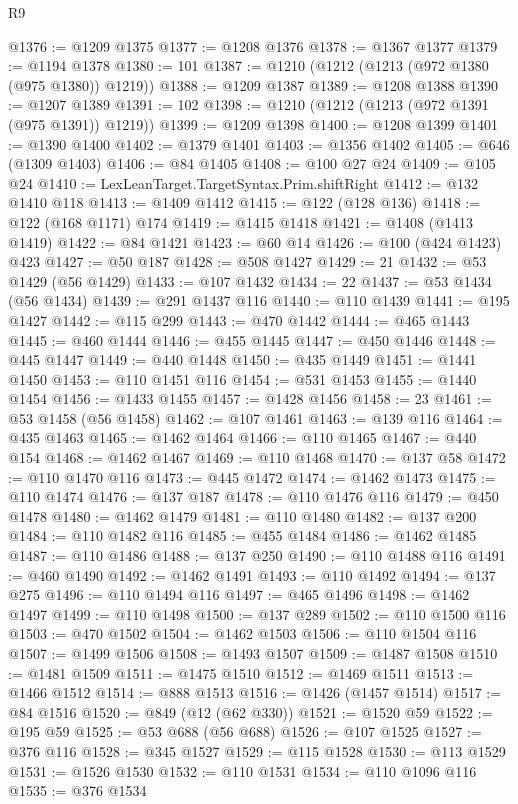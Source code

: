 \begin{lexlean}{R9}
\begin{coremodule}
@1376 := @1209 @1375
@1377 := @1208 @1376
@1378 := @1367 @1377
@1379 := @1194 @1378
@1380 := 101
@1387 := @1210 (@1212 (@1213 (@972 @1380 (@975 @1380)) @1219))
@1388 := @1209 @1387
@1389 := @1208 @1388
@1390 := @1207 @1389
@1391 := 102
@1398 := @1210 (@1212 (@1213 (@972 @1391 (@975 @1391)) @1219))
@1399 := @1209 @1398
@1400 := @1208 @1399
@1401 := @1390 @1400
@1402 := @1379 @1401
@1403 := @1356 @1402
@1405 := @646 (@1309 @1403)
@1406 := @84 @1405
@1408 := @100 @27 @24
@1409 := @105 @24
@1410 := LexLeanTarget.TargetSyntax.Prim.shiftRight
@1412 := @132 @1410 @118
@1413 := @1409 @1412
@1415 := @122 (@128 @136)
@1418 := @122 (@168 @1171) @174
@1419 := @1415 @1418
@1421 := @1408 (@1413 @1419)
@1422 := @84 @1421
@1423 := @60 @14
@1426 := @100 (@424 @1423) @423
@1427 := @50 @187
@1428 := @508 @1427
@1429 := 21
@1432 := @53 @1429 (@56 @1429)
@1433 := @107 @1432
@1434 := 22
@1437 := @53 @1434 (@56 @1434)
@1439 := @291 @1437 @116
@1440 := @110 @1439
@1441 := @195 @1427
@1442 := @115 @299
@1443 := @470 @1442
@1444 := @465 @1443
@1445 := @460 @1444
@1446 := @455 @1445
@1447 := @450 @1446
@1448 := @445 @1447
@1449 := @440 @1448
@1450 := @435 @1449
@1451 := @1441 @1450
@1453 := @110 @1451 @116
@1454 := @531 @1453
@1455 := @1440 @1454
@1456 := @1433 @1455
@1457 := @1428 @1456
@1458 := 23
@1461 := @53 @1458 (@56 @1458)
@1462 := @107 @1461
@1463 := @139 @116
@1464 := @435 @1463
@1465 := @1462 @1464
@1466 := @110 @1465
@1467 := @440 @154
@1468 := @1462 @1467
@1469 := @110 @1468
@1470 := @137 @58
@1472 := @110 @1470 @116
@1473 := @445 @1472
@1474 := @1462 @1473
@1475 := @110 @1474
@1476 := @137 @187
@1478 := @110 @1476 @116
@1479 := @450 @1478
@1480 := @1462 @1479
@1481 := @110 @1480
@1482 := @137 @200
@1484 := @110 @1482 @116
@1485 := @455 @1484
@1486 := @1462 @1485
@1487 := @110 @1486
@1488 := @137 @250
@1490 := @110 @1488 @116
@1491 := @460 @1490
@1492 := @1462 @1491
@1493 := @110 @1492
@1494 := @137 @275
@1496 := @110 @1494 @116
@1497 := @465 @1496
@1498 := @1462 @1497
@1499 := @110 @1498
@1500 := @137 @289
@1502 := @110 @1500 @116
@1503 := @470 @1502
@1504 := @1462 @1503
@1506 := @110 @1504 @116
@1507 := @1499 @1506
@1508 := @1493 @1507
@1509 := @1487 @1508
@1510 := @1481 @1509
@1511 := @1475 @1510
@1512 := @1469 @1511
@1513 := @1466 @1512
@1514 := @888 @1513
@1516 := @1426 (@1457 @1514)
@1517 := @84 @1516
@1520 := @849 (@12 (@62 @330))
@1521 := @1520 @59
@1522 := @195 @59
@1525 := @53 @688 (@56 @688)
@1526 := @107 @1525
@1527 := @376 @116
@1528 := @345 @1527
@1529 := @115 @1528
@1530 := @113 @1529
@1531 := @1526 @1530
@1532 := @110 @1531
@1534 := @110 @1096 @116
@1535 := @376 @1534

\end{coremodule}
\end{lexlean}
